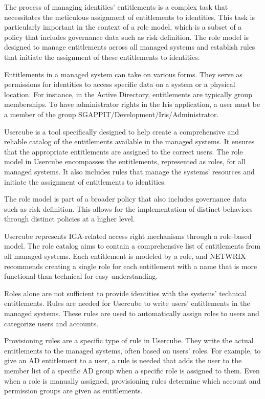 The process of managing identities’ entitlements is a complex task that necessitates the meticulous assignment of entitlements to identities. This task is particularly important in the context of a role model, which is a subset of a policy that includes governance data such as risk definition. The role model is designed to manage entitlements across all managed systems and establish rules that initiate the assignment of these entitlements to identities.

Entitlements in a managed system can take on various forms. They serve as permissions for identities to access specific data on a system or a physical location. For instance, in the Active Directory, entitlements are typically group memberships. To have administrator rights in the Iris application, a user must be a member of the group SGAPPIT/Development/Iris/Administrator.

Usercube is a tool specifically designed to help create a comprehensive and reliable catalog of the entitlements available in the managed systems. It ensures that the appropriate entitlements are assigned to the correct users. The role model in Usercube encompasses the entitlements, represented as roles, for all managed systems. It also includes rules that manage the systems’ resources and initiate the assignment of entitlements to identities.

The role model is part of a broader policy that also includes governance data such as risk definition. This allows for the implementation of distinct behaviors through distinct policies at a higher level.

Usercube represents IGA-related access right mechanisms through a role-based model. The role catalog aims to contain a comprehensive list of entitlements from all managed systems. Each entitlement is modeled by a role, and NETWRIX recommends creating a single role for each entitlement with a name that is more functional than technical for easy understanding.

Roles alone are not sufficient to provide identities with the systems’ technical entitlements. Rules are needed for Usercube to write users’ entitlements in the managed systems. These rules are used to automatically assign roles to users and categorize users and accounts.

Provisioning rules are a specific type of rule in Usercube. They write the actual entitlements to the managed systems, often based on users’ roles. For example, to give an AD entitlement to a user, a rule is needed that adds the user to the member list of a specific AD group when a specific role is assigned to them. Even when a role is manually assigned, provisioning rules determine which account and permission groups are given as entitlements.

